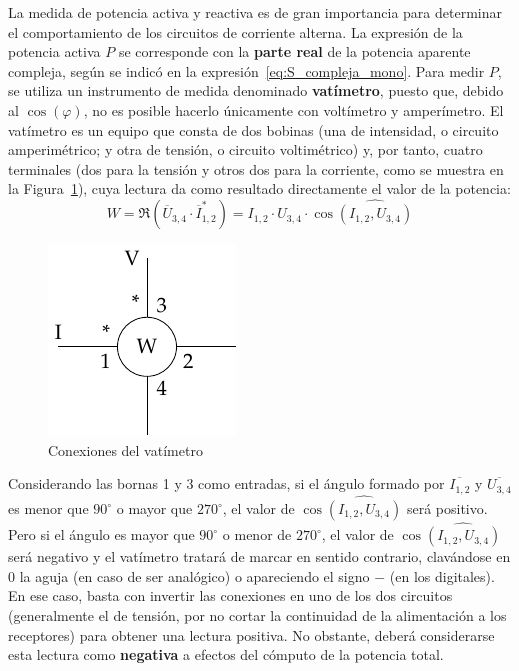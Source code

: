 La medida de potencia activa y reactiva es de gran importancia para
determinar el comportamiento de los circuitos de corriente alterna. La
expresión de la potencia activa $P$ se corresponde con la
\textbf{parte real} de la potencia aparente compleja, según se indicó
en la expresión~\eqref{eq:S_compleja_mono}. Para medir $P$, se utiliza
un instrumento de medida denominado \textbf{vatímetro}, puesto que,
debido al $\cos(\varphi)$, no es posible hacerlo únicamente con
voltímetro y amperímetro. El vatímetro es un equipo que consta de dos
bobinas (una de intensidad, o circuito amperimétrico; y otra de
tensión, o circuito voltimétrico) y, por tanto, cuatro terminales (dos
para la tensión y otros dos para la corriente, como se muestra en la
Figura~\ref{fig:vatimetro_2}), cuya lectura da como resultado
directamente el valor de la potencia:
\begin{equation*}
  W=\Re(\overline{U}_{3,4} \cdot \overline{I}_{1,2}^*)=I_{1,2}\cdot U_{3,4}\cdot \cos\widehat{(I_{1,2}, U_{3,4})}
\end{equation*}%
	
\begin{figure}[H]
  \centering \includegraphics{../figs/vatimetro_2.pdf}
  \caption{Conexiones del vatímetro}
  \label{fig:vatimetro_2}
\end{figure}
Considerando las bornas 1 y 3 como entradas, si el ángulo formado por
$\overline{I_{1,2}}$ y $\overline{U_{3,4}}$ es menor que $90^\circ$ o
mayor que $270^\circ$, el valor de $\cos\widehat{(I_{1,2}, U_{3,4})}$
será positivo. Pero si el ángulo es mayor que $90^\circ$ o menor de
$270^\circ$, el valor de $\cos\widehat{(I_{1,2}, U_{3,4})}$ será
negativo y el vatímetro tratará de marcar en sentido contrario,
clavándose en $0$ la aguja (en caso de ser analógico) o apareciendo el
signo $-$ (en los digitales). En ese caso, basta con invertir las
conexiones en uno de los dos circuitos (generalmente el de tensión,
por no cortar la continuidad de la alimentación a los receptores) para
obtener una lectura positiva. No obstante, deberá considerarse esta
lectura como \textbf{negativa} a efectos del cómputo de la potencia
total.
	
